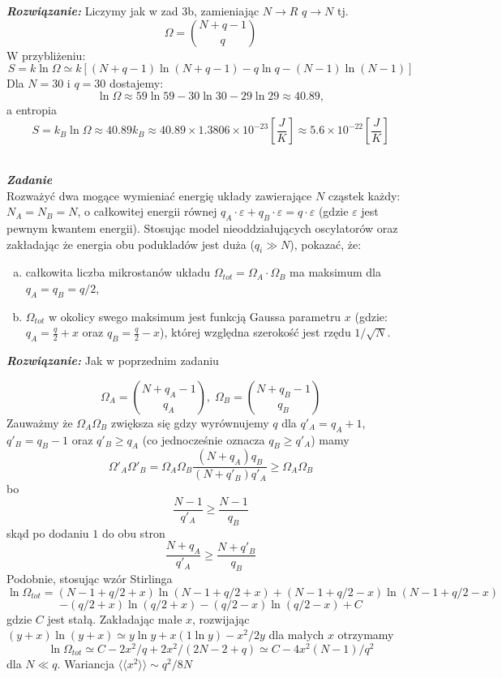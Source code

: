 \documentclass[11pt,a4paper]{article}
\newcounter{zadanie}\newcommand{\zadanie}[1][]{\addtocounter{zadanie}{1} ~\\  {\bf \emph{Zadanie \arabic{zadanie} #1 }} \\}
\begin{document}
{\bf \em Rozwiązanie:} Liczymy jak w zad 3b, zamieniając $N\to R$ $q\to N$ tj.
\[
\Omega=\binom{N+q-1}{q}
\]
W przybliżeniu:
\[
S=k\ln\Omega\simeq k[(N+q-1)\ln(N+q-1)- q\ln q-(N-1)\ln(N-1)]
\]
Dla $N = 30$ i $q = 30$ dostajemy:
\[
\ln \Omega \approx 59 \ln 59 - 30 \ln 30 -29 \ln 29 \approx40.89,
\]
a entropia
\[
S = k_B \ln \Omega \approx 40.89 k_B \approx 40.89 \times 1.3806 \times 10^{-23} \left[\frac{J}{K}\right] \approx 5.6 \times 10^{-22}\left[\frac{J}{K}\right]
\]
\zadanie
Rozważyć dwa mogące wymieniać energię układy zawierające $N$ cząstek każdy: $N_A = N_B = N$, 
o całkowitej energii równej $q_A\cdot\varepsilon + q_B\cdot\varepsilon = q\cdot\varepsilon$ (gdzie $\varepsilon$ jest pewnym kwantem energii). 
Stosując model nieoddziałujących oscylatorów oraz zakładając że energia obu podukladów jest duża ($q_i \gg N$), pokazać, że:
\begin{enumerate}[a)]
\item całkowita liczba mikrostanów układu 
      $\Omega_{tot} = \Omega_A \cdot \Omega_B$  
      ma maksimum dla $\displaystyle q_A = q_B = q/2$,
\item $\Omega_{tot}$ w okolicy swego maksimum jest funkcją Gaussa parametru 
      $x$ (gdzie: $\displaystyle q_A = \frac{q}{2} + x$ oraz\linebreak 
      $\displaystyle q_B = \frac{q}{2} - x$),
      której względna szerokość jest rzędu $1/\sqrt{N}$.
\end{enumerate}

{\bf \em Rozwiązanie:} Jak w poprzednim zadaniu

\[
\Omega_A=\binom{N+q_A-1}{q_A},\;\Omega_B=\binom{N+q_B-1}{q_B}
\]
Zauważmy że $\Omega_A\Omega_B$ zwiększa się gdzy wyrównujemy $q$
dla $q'_A=q_A+1$, $q'_B=q_B-1$ oraz $q'_B\geq q_A$ (co jednocześnie oznacza $q_B\geq q'_A$)
mamy
\[
\Omega'_A\Omega'_B=\Omega_A\Omega_B\frac{(N+q_A)q_B}{(N+q'_B)q'_A}\geq \Omega_A\Omega_B
\]
bo 
\[
\frac{N-1}{q'_A}\geq \frac{N-1}{q_B}
\] 
skąd po dodaniu $1$ do obu stron
\[
\frac{N+q_A}{q'_A}\geq\frac{N+q'_B}{q_B}
\]
Podobnie, stosując wzór Stirlinga
\[
\ln\Omega_{tot}=(N-1+q/2+x)\ln(N-1+q/2+x)+(N-1+q/2-x)\ln(N-1+q/2-x)
\]
\[
-(q/2+x)\ln(q/2+x)-(q/2-x)\ln(q/2-x)+C
\]
gdzie $C$ jest stałą.
Zakładając małe $x$, rozwijając $(y+x)\ln(y+x)\simeq y\ln y+x(1\ln y)-x^2/2y$ dla małych $x$ otrzymamy
\[
\ln\Omega_{tot}\simeq C-2x^2/q+2x^2/(2N-2+q)\simeq C-4x^2(N-1)/q^2
\]
dla $N\ll q$. Wariancja $\langle\langle x^2\rangle\rangle\sim q^2/8N$

\vspace*{1cm}
\end{document}

